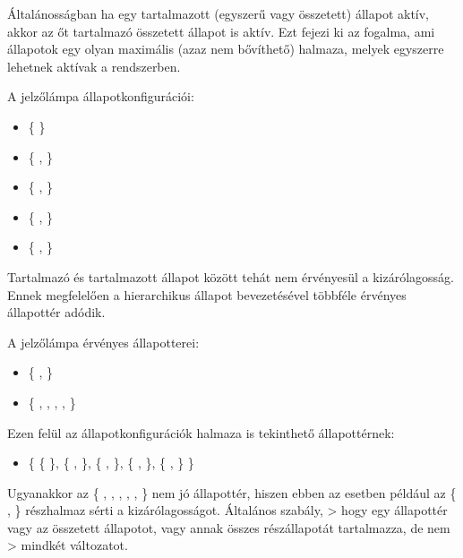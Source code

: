 Általánosságban ha egy tartalmazott (egyszerű vagy összetett) állapot aktív, akkor az őt tartalmazó összetett állapot is aktív. Ezt fejezi ki az  fogalma, ami állapotok egy olyan maximális (azaz nem bővíthető) halmaza, melyek egyszerre lehetnek aktívak a rendszerben.

\begin{megjegyzes}
A jelzőlámpa állapotkonfigurációi:

\begin{itemize}
\item \{  \}
\item \{ ,  \}
\item \{ ,  \}
\item \{ ,  \}
\item \{ ,  \}
\end{itemize}
\end{megjegyzes}

Tartalmazó és tartalmazott állapot között tehát nem érvényesül a kizárólagosság. Ennek megfelelően a hierarchikus állapot bevezetésével többféle érvényes állapottér adódik.

\begin{megjegyzes}
A jelzőlámpa érvényes állapotterei:

\begin{itemize}
	\item  \{ ,  \}
	\item  \{ , , , ,  \}
\end{itemize} 

Ezen felül az állapotkonfigurációk halmaza is tekinthető állapottérnek:

\begin{itemize}
	\item \{ \{  \}, \{ ,  \}, \{ ,  \}, \{ ,  \}, \{ ,  \} \}
\end{itemize}

Ugyanakkor az \{ , , , , ,  \} nem jó állapottér, hiszen ebben az esetben például az \{ ,  \} részhalmaz sérti a kizárólagosságot. Általános szabály, > hogy egy állapottér vagy az összetett állapotot, vagy annak összes részállapotát tartalmazza, de nem > mindkét változatot.
\end{megjegyzes}

